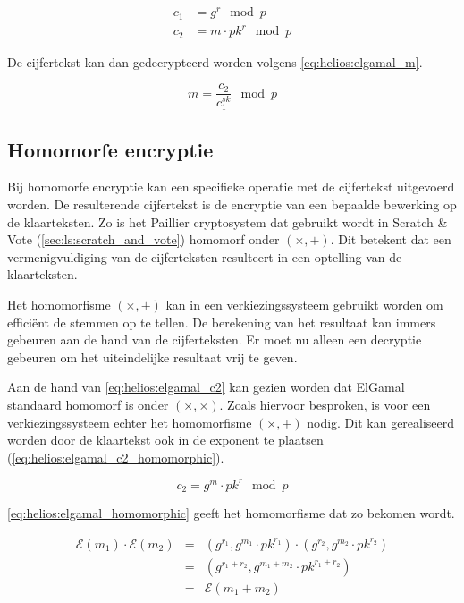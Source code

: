 \begin{align}
  \label{eq:helios:elgamal_c1} 
  c_1 & = g^r \mod{p} \\
  \label{eq:helios:elgamal_c2}
  c_2 & = m \cdot {pk}^r \mod{p}
\end{align}

\npar De cijfertekst kan dan gedecrypteerd worden volgens \ref{eq:helios:elgamal_m}.

\begin{equation}
  \label{eq:helios:elgamal_m}
  m = \frac{c_2}{c_1^{sk}} \mod{p}
\end{equation}

\subsection{Homomorfe encryptie}
\label{sec:helios:homomorfe_encryptie}

Bij homomorfe encryptie kan een specifieke operatie met de cijfertekst uitgevoerd worden. De resulterende cijfertekst is de encryptie van een bepaalde bewerking op de klaarteksten.\cite{wiki:homomorphic_encryption} Zo is het Paillier cryptosystem dat gebruikt wordt in Scratch \& Vote (\ref{sec:ls:scratch_and_vote}) homomorf onder $(\times, +)$. Dit betekent dat een vermenigvuldiging van de cijferteksten resulteert in een optelling van de klaarteksten.

\npar Het homomorfisme $(\times, +)$ kan in een verkiezingssysteem gebruikt worden om effici\"ent de stemmen op te tellen. De berekening van het resultaat kan immers gebeuren aan de hand van de cijferteksten. Er moet nu alleen een decryptie gebeuren om het uiteindelijke resultaat vrij te geven.

\npar Aan de hand van \ref{eq:helios:elgamal_c2} kan gezien worden dat ElGamal standaard homomorf is onder $(\times, \times)$. Zoals hiervoor besproken, is voor een verkiezingssysteem echter het homomorfisme $(\times, +)$ nodig. Dit kan gerealiseerd worden door de klaartekst ook in de exponent te plaatsen (\ref{eq:helios:elgamal_c2_homomorphic}).

\begin{equation}
  \label{eq:helios:elgamal_c2_homomorphic}
  c_2 = g^m \cdot {pk}^r \mod{p}
\end{equation}

\ref{eq:helios:elgamal_homomorphic} geeft het homomorfisme dat zo bekomen wordt.

\begin{equation}
  \label{eq:helios:elgamal_homomorphic}
  \begin{array}{lcl}
    \mathcal{E}(m_1) \cdot \mathcal{E}(m_2) &=& (g^{r_1}, g^{m_1} \cdot {pk}^{r_1}) \cdot (g^{r_2}, g^{m_2} \cdot {pk}^{r_2}) \\
      &=& (g^{r_1 + r_2}, g^{m_1 + m_2} \cdot {pk}^{r_1 + r_2}) \\
      &=& \mathcal{E}(m_1 + m_2)
  \end{array}
\end{equation}

